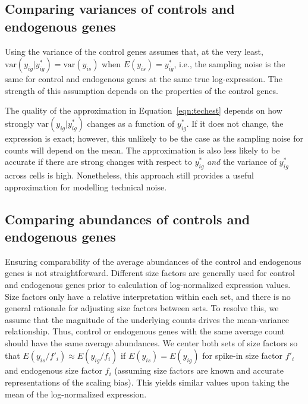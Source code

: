 \documentclass{article}
\begin{document}
\subsection{Comparing variances of controls and endogenous genes}
Using the variance of the control genes assumes that, at the very least, $\mbox{var}(y_{ig}|y_{ig}^*) = \mbox{var}(y_{is})$ when $E(y_{is}) = y_{ig}^*$, 
i.e., the sampling noise is the same for control and endogenous genes at the same true log-expression.
The strength of this assumption depends on the properties of the control genes.

The quality of the approximation in Equation~\ref{eqn:techest} depends on how strongly $\mbox{var}(y_{ig}|y_{ig}^*)$ changes as a function of $y^*_{ig}$.
If it does not change, the expression is exact; however, this unlikely to be the case as the sampling noise for counts will depend on the mean.
The approximation is also less likely to be accurate if there are strong changes with respect to $y_{ig}^*$ \textit{and} the variance of $y_{ig}^*$ across cells is high.
Nonetheless, this approach still provides a useful approximation for modelling technical noise.

\subsection{Comparing abundances of controls and endogenous genes}
Ensuring comparability of the average abundances of the control and endogenous genes is not straightforward.
Different size factors are generally used for control and endogenous genes prior to calculation of log-normalized expression values.
Size factors only have a relative interpretation within each set, and there is no general rationale for adjusting size factors between sets.
To resolve this, we assume that the magnitude of the underlying counts drives the mean-variance relationship.
Thus, control or endogenous genes with the same average count should have the same average abundances.
We center both sets of size factors so that $E(y_{is}/f'_i) \approx E(y_{ig}/f_i)$ if $E(y_{is})=E(y_{ig})$ for spike-in size factor $f'_i$ and endogenous size factor $f_i$ (assuming size factors are known and accurate representations of the scaling bias).
This yields similar values upon taking the mean of the log-normalized expression.
\end{document}
